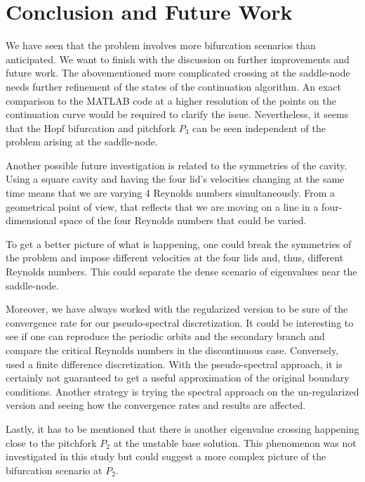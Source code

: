 
\section{Conclusion and Future Work} \label{concl}

We have seen that the problem involves more bifurcation scenarios than
anticipated. We want to finish with the discussion on further improvements and
future work. The abovementioned more complicated crossing at the saddle-node
needs further refinement of the states of the continuation algorithm. An exact
comparison to the MATLAB code at a higher resolution of the points on the
continuation curve would be required to clarify the issue. Nevertheless, it
seems that the Hopf bifurcation and pitchfork $P_3$ can be seen independent of
the problem arising at the saddle-node. 

Another possible future investigation is related to the symmetries of the
cavity. Using a square cavity and having the four lid's velocities changing at
the same time means that we are varying 4 Reynolds numbers simultaneously. From
a geometrical point of view, that reflects that we are moving on a line in a
four-dimensional space of the four Reynolds numbers that could be varied.

To get a better picture of what is happening, one could break the symmetries of
the problem and impose different velocities at the four lids and, thus,
different Reynolds numbers. This could separate the dense scenario of
eigenvalues near the saddle-node.

Moreover, we have always worked with the regularized version to be sure of the
convergence rate for our pseudo-spectral discretization. It could be
interesting to see if one can reproduce the periodic orbits and the secondary
branch and compare the critical Reynolds numbers in the discontinuous case.
Conversely, \citet{chen2013} used a finite difference discretization. With the
pseudo-spectral approach, it is certainly not guaranteed to get a useful
approximation of the original boundary conditions. Another strategy is trying
the spectral approach on the un-regularized version and seeing how the
convergence rates and results are affected.

Lastly, it has to be mentioned that there is another eigenvalue crossing
happening close to the pitchfork $P_2$ at the unstable base solution. This
phenomenon was not investigated in this study but could suggest a more complex
picture of the bifurcation scenario at $P_2$.

